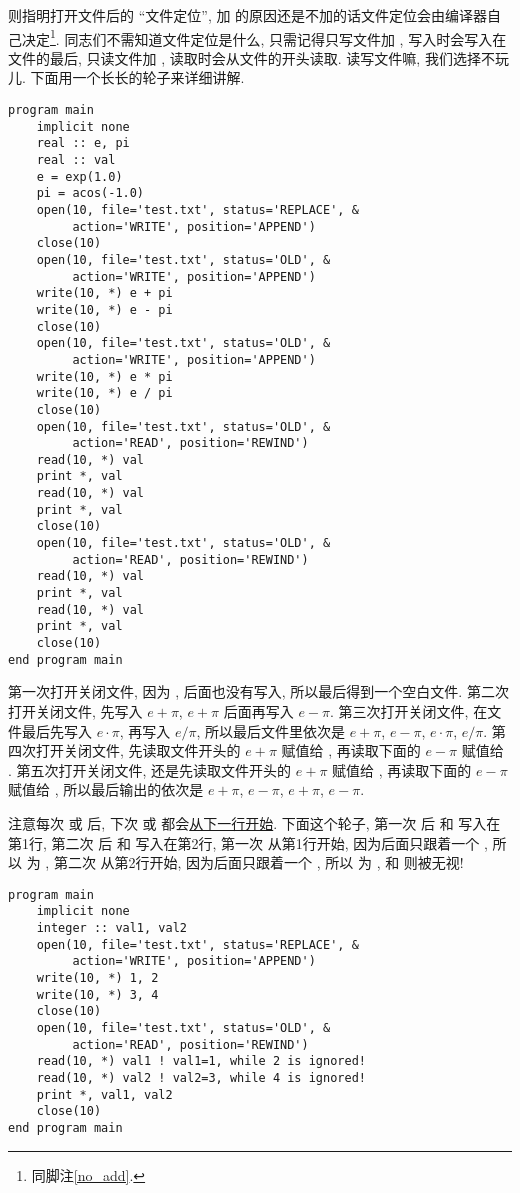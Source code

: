  则指明打开文件后的 ``文件定位'', 加  的原因还是不加的话文件定位会由编译器自己决定\footnote{同脚注\ref{no_add}.}. 同志们不需知道文件定位是什么, 只需记得只写文件加 , 写入时会写入在文件的最后, 只读文件加 , 读取时会从文件的开头读取. 读写文件嘛, 我们选择不玩儿. 下面用一个长长的轮子来详细讲解. 
\begin{lstlisting}
program main
    implicit none
    real :: e, pi
    real :: val
    e = exp(1.0)
    pi = acos(-1.0)
    open(10, file='test.txt', status='REPLACE', &
         action='WRITE', position='APPEND')
    close(10)
    open(10, file='test.txt', status='OLD', &
         action='WRITE', position='APPEND')
    write(10, *) e + pi
    write(10, *) e - pi
    close(10)
    open(10, file='test.txt', status='OLD', &
         action='WRITE', position='APPEND')
    write(10, *) e * pi
    write(10, *) e / pi
    close(10)
    open(10, file='test.txt', status='OLD', &
         action='READ', position='REWIND')
    read(10, *) val
    print *, val
    read(10, *) val
    print *, val
    close(10)
    open(10, file='test.txt', status='OLD', &
         action='READ', position='REWIND')
    read(10, *) val
    print *, val
    read(10, *) val
    print *, val
    close(10)
end program main
\end{lstlisting}
第一次打开关闭文件, 因为 , 后面也没有写入, 所以最后得到一个空白文件. 第二次打开关闭文件, 先写入 $ e+\pi $, $ e+\pi $ 后面再写入 $ e-\pi $. 第三次打开关闭文件, 在文件最后先写入 $ e\cdot\pi $, 再写入 $ e/\pi $, 所以最后文件里依次是 $ e+\pi $, $ e-\pi $, $ e\cdot\pi $, $ e/\pi $. 第四次打开关闭文件, 先读取文件开头的 $ e+\pi $ 赋值给 , 再读取下面的 $ e-\pi $ 赋值给 . 第五次打开关闭文件, 还是先读取文件开头的 $ e+\pi $ 赋值给 , 再读取下面的 $ e-\pi $ 赋值给 , 所以最后输出的依次是 $ e+\pi $, $ e-\pi $, $ e+\pi $, $ e-\pi $. 

注意每次  或  后, 下次  或  都会\uline{从下一行开始}. 下面这个轮子, 第一次  后  和  写入在第1行, 第二次  后  和  写入在第2行, 第一次  从第1行开始, 因为后面只跟着一个 , 所以  为 , 第二次  从第2行开始, 因为后面只跟着一个 , 所以  为 ,  和  则被无视!
\begin{lstlisting}
program main
    implicit none
    integer :: val1, val2
    open(10, file='test.txt', status='REPLACE', &
         action='WRITE', position='APPEND')
    write(10, *) 1, 2
    write(10, *) 3, 4
    close(10)
    open(10, file='test.txt', status='OLD', &
         action='READ', position='REWIND')
    read(10, *) val1 ! val1=1, while 2 is ignored!
    read(10, *) val2 ! val2=3, while 4 is ignored!
    print *, val1, val2
    close(10)
end program main
\end{lstlisting}

